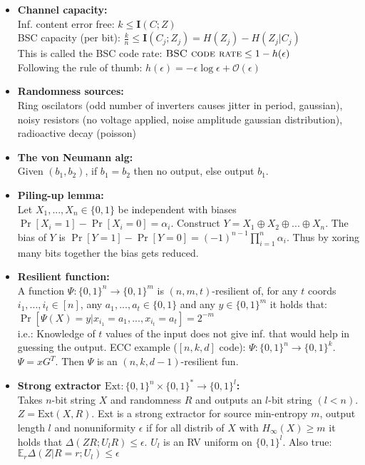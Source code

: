 \documentclass[twocolumn,9pt]{extarticle}
\begin{document}
\begin{itemize}
	\item \textbf{Channel capacity:} \\
	Inf. content error free: $k \leq \mathbf{I}(C;Z)$\\
	BSC capacity (per bit): $\frac{k}{n} \leq \mathbf{I}(C_j;Z_j) = H(Z_j) - H(Z_j|C_j)$ \\
	This is called the BSC code rate: $\textsc{BSC code rate} \leq 1 - h(\epsilon)$ \\
	Following the rule of thumb: $h(\epsilon) = -\epsilon \log \epsilon + \mathcal{O}(\epsilon)$


	\item \textbf{Randomness sources: } \\
	Ring oscilators (odd number of inverters causes jitter in period, gaussian), noisy resistors (no voltage applied, noise amplitude gaussian distribution), radioactive decay (poisson)

	\item \textbf{The von Neumann alg: } \\
	Given $(b_1, b_2)$, if $b_1 = b_2$ then no output, else output $b_1$.

	\item \textbf{Piling-up lemma: } \\
	Let $X_1, ..., X_n \in \{0,1\}$ be independent with biases $\Pr[X_i=1]-\Pr[X_i=0]=\alpha_i$. Construct $Y = X_1 \oplus X_2 \oplus ... \oplus X_n$. The bias of $Y$ is $\Pr[Y=1]-\Pr[Y=0] = (-1)^{n-1} \prod_{i=1}^n \alpha_i$. Thus by xoring many bits together the bias gets reduced.

	\item \textbf{Resilient function:} \\
	A function $\Psi : \{0,1\}^n \rightarrow \{0,1\}^m$ is $(n,m,t)$-resilient of, for any $t$ coords $i_1,...,i_t \in [n]$, any $a_1,...,a_t \in \{0,1\}$ and any $y \in \{0,1\}^m$ it holds that: $\Pr[\Psi(X)=y|x_{i_1}=a_1,...,x_{i_t}=a_t] = 2^{-m}$\\
	i.e.: Knowledge of $t$ values of the input does not give inf. that would help in guessing the output. ECC example ($[n,k,d]$ code): $\Psi : \{0,1\}^n \rightarrow \{0,1\}^k$. $\Psi = xG^T$. Then $\Psi$ is an $(n,k,d-1)$-resilient fun.

	\item \textbf{Strong extractor $\text{Ext} : \{0,1\}^n \times \{0,1\}^* \rightarrow \{0,1\}^l$:} \\
	Takes $n$-bit string $X$ and randomness $R$ and outputs an $l$-bit string $(l < n)$. $Z = \text{Ext}(X,R)$. Ext is a strong extractor for source min-entropy $m$, output length $l$ and nonuniformity $\epsilon$ if for all distrib of $X$ with $H_\infty(X) \geq m$ it holds that $\Delta(ZR;U_lR) \leq \epsilon$. $U_l$ is an RV uniform on $\{0,1\}^l$. Also true: $\mathbb{E}_r\Delta(Z|R=r;U_l)\leq\epsilon$


\end{itemize}
\end{document}
